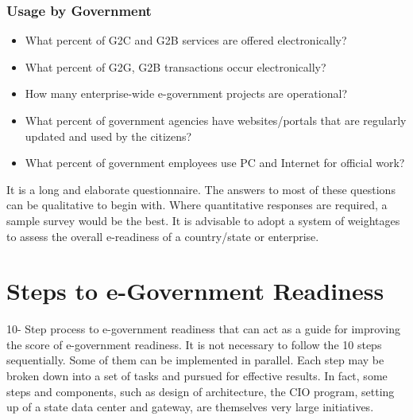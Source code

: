 \subsubsection*{Usage by Government}
\begin{itemize}
	\item What percent of G2C and G2B services are offered electronically?
	\item What percent of G2G, G2B transactions occur electronically?
	\item How many enterprise-wide e-government projects are operational?
	\item What percent of government agencies have websites/portals that are regularly updated and used by the citizens?
	\item What percent of government employees use PC and Internet for official work?
\end{itemize}

It is a long and elaborate questionnaire. The answers to most of these questions can be qualitative to begin with. Where quantitative responses are required, a sample survey would be the best. It is advisable to adopt a system of weightages to assess the overall e-readiness of a country/state or enterprise.

\section{Steps to e-Government Readiness}
10- Step process to e-government readiness that can act as a guide for improving the score of e-government readiness. It is not necessary to follow the 10 steps sequentially. Some of them can be implemented in parallel. Each step may be broken down into a set of tasks and pursued for effective results. In fact, some steps and components, such as design of architecture, the CIO program, setting up of a state data center and gateway, are themselves very large initiatives.

